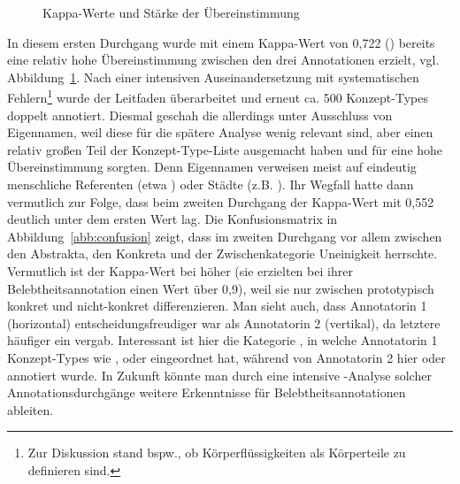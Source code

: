 \begin{figure}
\caption {Kappa-Werte und Stärke der Übereinstimmung \parencite[576]{Artstein2008}\label{abb:kappa-skala}}
\end{figure} 

In diesem ersten Durchgang wurde mit einem Kappa-Wert von 0,722 () bereits eine relativ hohe Übereinstimmung zwischen den drei Annotationen  erzielt, vgl. Abbildung~\ref{abb:kappa-skala}. 
Nach einer intensiven Auseinandersetzung mit systematischen Fehlern\footnote{Zur Diskussion stand bspw., ob Körperflüssigkeiten als Körperteile zu definieren sind.} wurde der Leitfaden überarbeitet und erneut ca. 500 Konzept-Types  doppelt  annotiert. Diesmal geschah die  allerdings unter Ausschluss von  Eigennamen, weil diese für die spätere Analyse wenig relevant sind, aber einen relativ großen Teil der Konzept-Type-Liste  ausgemacht haben und für eine hohe Übereinstimmung sorgten. Denn Eigennamen  verweisen meist auf eindeutig menschliche Referenten (etwa ) oder Städte (z.B. ).
Ihr Wegfall hatte dann vermutlich zur Folge, dass beim zweiten Durchgang der Kappa-Wert mit 0,552 deutlich unter dem ersten Wert lag. 
Die Konfusionsmatrix in Abbildung~\ref{abb:confusion} zeigt, dass im zweiten Durchgang vor allem zwischen den  Abstrakta, den Konkreta  und der Zwischenkategorie  Uneinigkeit herrschte. Vermutlich ist der Kappa-Wert bei \textcite{Zaenen2004} höher (sie erzielten bei ihrer Belebtheitsannotation einen Wert über 0,9), weil sie nur zwischen prototypisch konkret  und nicht-konkret differenzieren. Man sieht auch, dass Annotatorin 1 (horizontal) entscheidungsfreudiger war als Annotatorin 2 (vertikal), da letztere häufiger ein  vergab. Interessant ist hier die Kategorie , in welche Annotatorin 1 Konzept-Types  wie ,  oder  eingeordnet hat, während von Annotatorin 2 hier  oder  annotiert wurde. In Zukunft könnte man durch eine intensive -Analyse solcher Annotationsdurchgänge  weitere Erkenntnisse für Belebtheitsannotationen   ableiten.  
 
